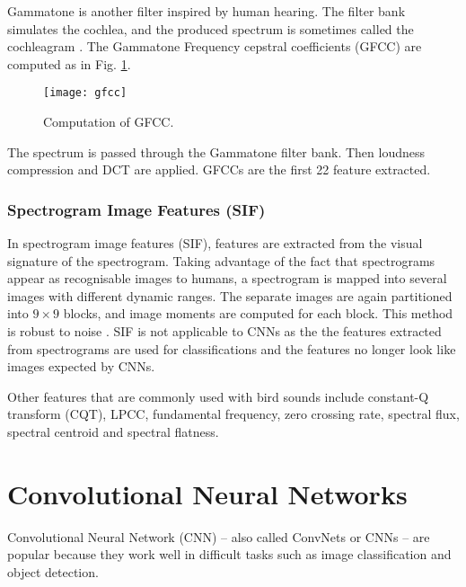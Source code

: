 Gammatone is another filter inspired by human hearing. The filter bank simulates the cochlea, and the produced spectrum is sometimes called the cochleagram \cite{Xie2017}. The Gammatone Frequency cepstral coefficients (GFCC) are computed as in Fig. \ref{gfcc}.

\begin{figure}[h]
    \centering
    \texttt{[image: gfcc]}
    \caption{Computation of GFCC.}
    \label{gfcc}
\end{figure}

The spectrum is passed through the Gammatone filter bank. Then loudness compression and DCT are applied. GFCCs are the first 22 feature extracted.

\subsubsection{Spectrogram Image Features (SIF)}

In spectrogram image features (SIF), features are extracted from the visual signature of the spectrogram. Taking advantage of the fact that spectrograms appear as recognisable images to humans, a spectrogram is mapped into several images with different dynamic ranges. The separate images are again partitioned into $9 \times 9$ blocks, and image moments are computed for each block. This method is robust to noise \cite{Dennis2010}. SIF is not applicable to CNNs as the the features extracted from spectrograms are used for classifications and the features no longer look like images expected by CNNs.


Other features that are commonly used with bird sounds include constant-Q transform (CQT), LPCC, fundamental frequency, zero crossing rate, spectral flux, spectral centroid and spectral flatness.



\section{Convolutional Neural Networks}

Convolutional Neural Network (CNN) -- also called ConvNets or CNNs -- are popular because they work well in difficult tasks such as image classification and object detection.

